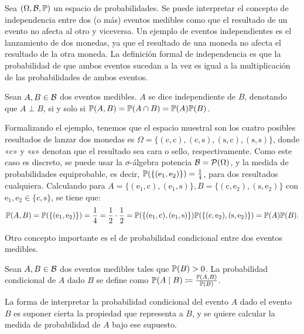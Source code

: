 Sea \((\Omega, \mathcal{B}, \mathbb{P})\) un espacio de probabilidades. Se puede interpretar el concepto de independencia entre dos (o más) eventos medibles como que el resultado de un evento no afecta al otro y viceversa. Un ejemplo de eventos independientes es el lanzamiento de dos monedas, ya que el resultado de una moneda no afecta el resultado de la otra moneda. La definición formal de independencia es que la probabilidad de que ambos eventos sucedan a la vez es igual a la multiplicación de las probabilidades de ambos eventos.

\begin{definition}
	Sean \(A, B \in \mathcal{B}\) dos eventos medibles. \(A\) se dice independiente de \(B\), denotando que \(A \perp B\), si y solo si \(\mathbb{P} (A, B) = \mathbb{P} (A \cap B) = \mathbb{P} (A) \mathbb{P} (B)\).
\end{definition}

Formalizando el ejemplo, tenemos que el espacio muestral son los cuatro posibles resultados de lanzar dos monedas es \(\Omega = \{(\mathrm{c}, \mathrm{c}), (\mathrm{c}, \mathrm{s}), (\mathrm{s}, \mathrm{c}), (\mathrm{s}, \mathrm{s})\}\), donde «c» y «s» denotan que el resultado sea cara o sello, respectivamente. Como este caso es discreto, se puede usar la \(\sigma\)-álgebra potencia \(\mathcal{B} = \mathcal{P}(\Omega)\), y la medida de probabilidades equiprobable, es decir, \(\mathbb{P}(\{(\mathrm{e}_1, \mathrm{e}_2)\}) = \frac{1}{4}\), para dos resultados cualquiera. Calculando para \(A = \{(\mathrm{e}_1, \mathrm{c}), (\mathrm{e}_1, \mathrm{s})\}, B = \{(\mathrm{c}, \mathrm{e}_2), (\mathrm{s}, \mathrm{e}_2)\}\) con \(\mathrm{e}_1, \mathrm{e}_2 \in \{\mathrm{c}, \mathrm{s}\}\), se tiene que:
\begin{equation*}
	\mathbb{P} (A, B) = \mathbb{P}(\{(\mathrm{e}_1, \mathrm{e}_2)\}) = \frac{1}{4} = \frac{1}{2} \cdot \frac{1}{2} = \mathbb{P}(\{(\mathrm{e}_1, \mathrm{c}),(\mathrm{e}_1, \mathrm{s})\}) \mathbb{P}(\{(\mathrm{c}, \mathrm{e}_2), (\mathrm{s}, \mathrm{e}_2)\}) = \mathbb{P}(A) \mathbb{P}(B).
\end{equation*}

Otro concepto importante es el de probabilidad condicional entre dos eventos medibles.
\begin{definition}
	Sean \(A, B \in \mathcal{B}\) dos eventos medibles tales que \(\mathbb{P}(B) > 0\). La probabilidad condicional de \(A\) dado \(B\) se define como \(\mathbb{P}(A \mid B) \coloneqq \frac{\mathbb{P}(A, B)}{\mathbb{P}(B)}\).
\end{definition}

La forma de interpretar la probabilidad condicional del evento \(A\) dado el evento \(B\) es suponer cierta la propiedad que representa a \(B\), y se quiere calcular la medida de probabilidad de \(A\) bajo ese supuesto.

